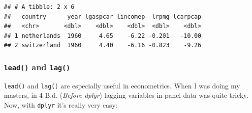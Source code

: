 \documentclass[]{gitbook}
\newenvironment{Shaded}{\begin{snugshade}}{\end{snugshade}}
\newcommand{\DataTypeTok}[1]{\textcolor[rgb]{0.13,0.29,0.53}{#1}}
\newcommand{\DecValTok}[1]{\textcolor[rgb]{0.00,0.00,0.81}{#1}}
\newcommand{\KeywordTok}[1]{\textcolor[rgb]{0.13,0.29,0.53}{\textbf{#1}}}
\newcommand{\NormalTok}[1]{#1}
\newcommand{\OperatorTok}[1]{\textcolor[rgb]{0.81,0.36,0.00}{\textbf{#1}}}
\newcommand{\StringTok}[1]{\textcolor[rgb]{0.31,0.60,0.02}{#1}}
\theoremstyle{definition}
\theoremstyle{definition}
\theoremstyle{definition}
\theoremstyle{remark}
\begin{document}
\begin{Shaded}
\end{Shaded}

\begin{verbatim}
## # A tibble: 2 x 6
##   country      year lgaspcar lincomep  lrpmg lcarpcap
##   <chr>       <dbl>    <dbl>    <dbl>  <dbl>    <dbl>
## 1 netherlands  1960     4.65    -6.22 -0.201   -10.00
## 2 switzerland  1960     4.40    -6.16 -0.823    -9.26
\end{verbatim}

\hypertarget{lead-and-lag}{%
\subsubsection{\texorpdfstring{\texttt{lead()} and
\texttt{lag()}}{lead() and lag()}}\label{lead-and-lag}}

\texttt{lead()} and \texttt{lag()} are especially useful in
econometrics. When I was doing my masters, in 4 B.d. (\emph{Before
dplyr}) lagging variables in panel data was quite tricky. Now, with
\texttt{dplyr} it's really very easy:

\begin{Shaded}
\end{Shaded}
\end{document}
